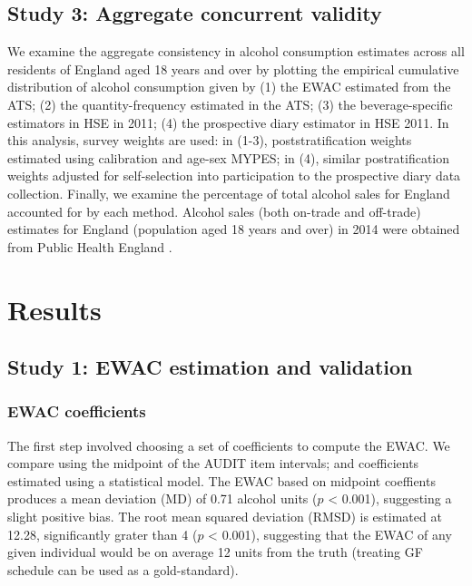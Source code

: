 \documentclass[]{article}
\begin{document}
\hypertarget{study-3-aggregate-concurrent-validity}{%
\subsection{Study 3: Aggregate concurrent
validity}\label{study-3-aggregate-concurrent-validity}}

We examine the aggregate consistency in alcohol consumption estimates
across all residents of England aged 18 years and over by plotting the
empirical cumulative distribution of alcohol consumption given by (1)
the EWAC estimated from the ATS; (2) the quantity-frequency estimated in
the ATS; (3) the beverage-specific estimators in HSE in 2011; (4) the
prospective diary estimator in HSE 2011. In this analysis, survey
weights are used: in (1-3), poststratification weights estimated using
calibration and age-sex MYPES; in (4), similar postratification weights
adjusted for self-selection into participation to the prospective diary
data collection. Finally, we examine the percentage of total alcohol
sales for England accounted for by each method. Alcohol sales (both
on-trade and off-trade) estimates for England (population aged 18 years
and over) in 2014 were obtained from Public Health England
\citep{PHE2017}.

\hypertarget{results}{%
\section{Results}\label{results}}

\hypertarget{study-1-ewac-estimation-and-validation}{%
\subsection{Study 1: EWAC estimation and
validation}\label{study-1-ewac-estimation-and-validation}}

\hypertarget{ewac-coefficients}{%
\subsubsection{EWAC coefficients}\label{ewac-coefficients}}

The first step involved choosing a set of coefficients to compute the
EWAC. We compare using the midpoint of the AUDIT item intervals; and
coefficients estimated using a statistical model. The EWAC based on
midpoint coeffients produces a mean deviation (MD) of 0.71 alcohol units
(\(p\) \textless{} 0.001), suggesting a slight positive bias. The root
mean squared deviation (RMSD) is estimated at 12.28, significantly
grater than 4 (\(p\) \textless{} 0.001), suggesting that the EWAC of any
given individual would be on average 12 units from the truth (treating
GF schedule can be used as a gold-standard).
\end{document}
